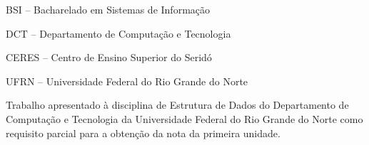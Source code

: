 
\instituicao
{
	BSI -- Bacharelado em Sistemas de Informação\par 
	DCT -- Departamento de Computação e Tecnologia\par
   CERES -- Centro de Ensino Superior do Seridó\par
   UFRN -- Universidade Federal do Rio Grande do Norte
}
	
\comentario
{
	Trabalho apresentado à disciplina de Estrutura de Dados do Departamento de Computação e Tecnologia da Universidade Federal do Rio Grande do Norte como requisito parcial para a obtenção da nota da primeira unidade.\bigskip\\
%  
}
		
	
\folhaderosto